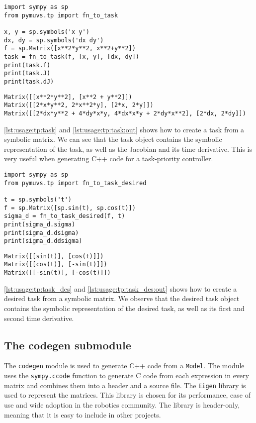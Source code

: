 \begin{lstlisting}[style=custompython,
    caption={Creating a task from a function.},
    label={lst:usage:tp:task}]
import sympy as sp
from pymuvs.tp import fn_to_task

x, y = sp.symbols('x y')
dx, dy = sp.symbols('dx dy')
f = sp.Matrix([x**2*y**2, x**2+y**2])
task = fn_to_task(f, [x, y], [dx, dy])
print(task.f)
print(task.J)
print(task.dJ)
\end{lstlisting}
\begin{lstlisting}[style=customtxt,
    caption={Output of \autoref{lst:usage:tp:task}.},
    label={lst:usage:tp:task:out}]
Matrix([[x**2*y**2], [x**2 + y**2]])
Matrix([[2*x*y**2, 2*x**2*y], [2*x, 2*y]])
Matrix([[2*dx*y**2 + 4*dy*x*y, 4*dx*x*y + 2*dy*x**2], [2*dx, 2*dy]])
\end{lstlisting}
\autoref{lst:usage:tp:task} and \autoref{lst:usage:tp:task:out} shows how to create a task from a symbolic
matrix. We can see that the task object contains the symbolic representation of
the task, as well as the Jacobian and its time derivative. This is very useful
when generating C++ code for a task-priority controller.

\begin{lstlisting}[style=custompython,
    caption={Generating a desired task from a function.},
    label={lst:usage:tp:task_des}]
import sympy as sp
from pymuvs.tp import fn_to_task_desired

t = sp.symbols('t')
f = sp.Matrix([sp.sin(t), sp.cos(t)])
sigma_d = fn_to_task_desired(f, t)
print(sigma_d.sigma)
print(sigma_d.dsigma)
print(sigma_d.ddsigma)
\end{lstlisting}
\begin{lstlisting}[style=customtxt,
    caption={Output of \autoref{lst:usage:tp:task_des}.},
    label={lst:usage:tp:task_des:out}]
Matrix([[sin(t)], [cos(t)]])
Matrix([[cos(t)], [-sin(t)]])
Matrix([[-sin(t)], [-cos(t)]])
\end{lstlisting}
\autoref{lst:usage:tp:task_des} and \autoref{lst:usage:tp:task_des:out} shows
how to create a desired task from a symbolic matrix. We observe that the desired
task object contains the symbolic representation of the desired task, as well as
its first and second time derivative.





\subsection{The codegen submodule}
The \texttt{codegen} module is used to generate C++ code from a \texttt{Model}. The module
uses the \texttt{sympy.ccode} function to generate C code from
each expression in every matrix and combines them into a header and a source
file. The \texttt{Eigen} library \cite{eigen3} is used to represent the matrices.
This library is chosen for its performance, ease of use and wide adoption in the
robotics community. The library is header-only, meaning that it is easy to
include in other projects.


